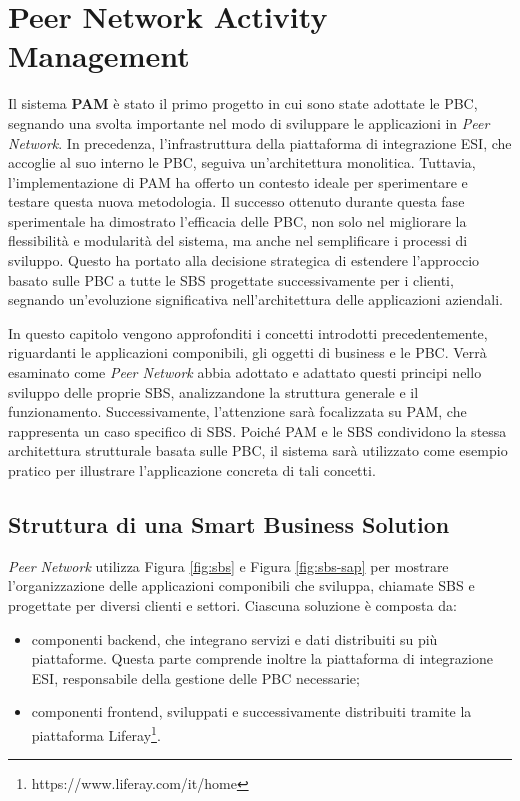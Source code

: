 \chapter{Peer Network Activity Management}
\label{chap:pam}

Il sistema \textbf{\ac{PAM}} è stato il primo progetto in cui sono state
adottate le \ac{PBC}, segnando una svolta importante nel modo di sviluppare le applicazioni in \textit{Peer Network}.
In precedenza, l’infrastruttura della piattaforma di integrazione \ac{ESI}, che accoglie al suo interno
le \ac{PBC}, seguiva un’architettura monolitica. Tuttavia, l’implementazione di \ac{PAM} ha offerto un contesto
ideale per sperimentare e testare questa nuova metodologia. Il successo ottenuto
durante questa fase sperimentale ha dimostrato l’efficacia delle \ac{PBC}, non solo nel migliorare la
flessibilità e modularità del sistema, ma anche nel semplificare i processi di sviluppo. Questo ha
portato alla decisione strategica di estendere l’approccio basato sulle \ac{PBC} a tutte le
\ac{SBS} progettate successivamente per i clienti, segnando un’evoluzione
significativa nell’architettura delle applicazioni aziendali.

In questo capitolo vengono approfonditi i concetti introdotti precedentemente, riguardanti
le applicazioni componibili, gli oggetti di business e le \ac{PBC}. Verrà esaminato come \textit{Peer Network} abbia
adottato e adattato questi principi nello sviluppo delle proprie \ac{SBS}, analizzandone la struttura
generale e il funzionamento. Successivamente, l’attenzione sarà focalizzata su \ac{PAM}, che rappresenta un
caso specifico di \ac{SBS}. Poiché \ac{PAM} e le \ac{SBS} condividono la stessa architettura strutturale basata sulle
\ac{PBC}, il sistema sarà utilizzato come esempio pratico per illustrare l’applicazione concreta di tali
concetti.

\section{Struttura di una Smart Business Solution}
\textit{Peer Network} utilizza Figura \ref{fig:sbs} e Figura \ref{fig:sbs-sap} per mostrare l'organizzazione delle
applicazioni componibili che sviluppa,
chiamate \ac{SBS} e progettate per diversi clienti e settori. Ciascuna
soluzione è composta da:
\begin{itemize}
    \item componenti backend, che integrano servizi e dati distribuiti su più piattaforme. Questa parte
    comprende inoltre la piattaforma di integrazione \ac{ESI}, responsabile della gestione delle \ac{PBC}
    necessarie;
    \item componenti frontend, sviluppati e successivamente distribuiti tramite la piattaforma Liferay\footnote{https://www.liferay.com/it/home}.
\end{itemize}

